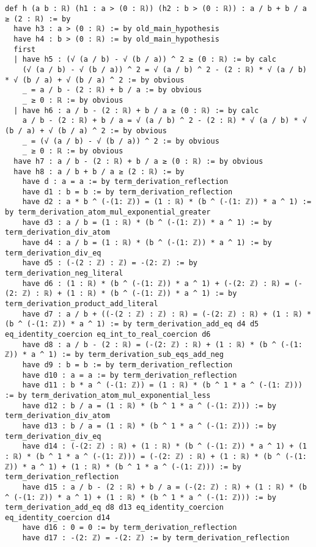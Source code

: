 \documentclass{article}
\begin{document}
\begin{tcolorbox}[colback=white!10, width=\linewidth]
\begin{lstlisting}[language=Lean4]
def h (a b : ℝ) (h1 : a > (0 : ℝ)) (h2 : b > (0 : ℝ)) : a / b + b / a ≥ (2 : ℝ) := by
  have h3 : a > (0 : ℝ) := by old_main_hypothesis
  have h4 : b > (0 : ℝ) := by old_main_hypothesis
  first
  | have h5 : (√ (a / b) - √ (b / a)) ^ 2 ≥ (0 : ℝ) := by calc
    (√ (a / b) - √ (b / a)) ^ 2 = √ (a / b) ^ 2 - (2 : ℝ) * √ (a / b) * √ (b / a) + √ (b / a) ^ 2 := by obvious
    _ = a / b - (2 : ℝ) + b / a := by obvious
    _ ≥ 0 : ℝ := by obvious
  | have h6 : a / b - (2 : ℝ) + b / a ≥ (0 : ℝ) := by calc
    a / b - (2 : ℝ) + b / a = √ (a / b) ^ 2 - (2 : ℝ) * √ (a / b) * √ (b / a) + √ (b / a) ^ 2 := by obvious
    _ = (√ (a / b) - √ (b / a)) ^ 2 := by obvious
    _ ≥ 0 : ℝ := by obvious
  have h7 : a / b - (2 : ℝ) + b / a ≥ (0 : ℝ) := by obvious
  have h8 : a / b + b / a ≥ (2 : ℝ) := by
    have d : a = a := by term_derivation_reflection
    have d1 : b = b := by term_derivation_reflection
    have d2 : a * b ^ (-(1: ℤ)) = (1 : ℝ) * (b ^ (-(1: ℤ)) * a ^ 1) := by term_derivation_atom_mul_exponential_greater
    have d3 : a / b = (1 : ℝ) * (b ^ (-(1: ℤ)) * a ^ 1) := by term_derivation_div_atom
    have d4 : a / b = (1 : ℝ) * (b ^ (-(1: ℤ)) * a ^ 1) := by term_derivation_div_eq
    have d5 : (-(2 : ℤ) : ℤ) = -(2: ℤ) := by term_derivation_neg_literal
    have d6 : (1 : ℝ) * (b ^ (-(1: ℤ)) * a ^ 1) + (-(2: ℤ) : ℝ) = (-(2: ℤ) : ℝ) + (1 : ℝ) * (b ^ (-(1: ℤ)) * a ^ 1) := by term_derivation_product_add_literal
    have d7 : a / b + ((-(2 : ℤ) : ℤ) : ℝ) = (-(2: ℤ) : ℝ) + (1 : ℝ) * (b ^ (-(1: ℤ)) * a ^ 1) := by term_derivation_add_eq d4 d5 eq_identity_coercion eq_int_to_real_coercion d6
    have d8 : a / b - (2 : ℝ) = (-(2: ℤ) : ℝ) + (1 : ℝ) * (b ^ (-(1: ℤ)) * a ^ 1) := by term_derivation_sub_eqs_add_neg
    have d9 : b = b := by term_derivation_reflection
    have d10 : a = a := by term_derivation_reflection
    have d11 : b * a ^ (-(1: ℤ)) = (1 : ℝ) * (b ^ 1 * a ^ (-(1: ℤ))) := by term_derivation_atom_mul_exponential_less
    have d12 : b / a = (1 : ℝ) * (b ^ 1 * a ^ (-(1: ℤ))) := by term_derivation_div_atom
    have d13 : b / a = (1 : ℝ) * (b ^ 1 * a ^ (-(1: ℤ))) := by term_derivation_div_eq
    have d14 : (-(2: ℤ) : ℝ) + (1 : ℝ) * (b ^ (-(1: ℤ)) * a ^ 1) + (1 : ℝ) * (b ^ 1 * a ^ (-(1: ℤ))) = (-(2: ℤ) : ℝ) + (1 : ℝ) * (b ^ (-(1: ℤ)) * a ^ 1) + (1 : ℝ) * (b ^ 1 * a ^ (-(1: ℤ))) := by term_derivation_reflection
    have d15 : a / b - (2 : ℝ) + b / a = (-(2: ℤ) : ℝ) + (1 : ℝ) * (b ^ (-(1: ℤ)) * a ^ 1) + (1 : ℝ) * (b ^ 1 * a ^ (-(1: ℤ))) := by term_derivation_add_eq d8 d13 eq_identity_coercion eq_identity_coercion d14
    have d16 : 0 = 0 := by term_derivation_reflection
    have d17 : -(2: ℤ) = -(2: ℤ) := by term_derivation_reflection

\end{lstlisting}
\end{tcolorbox}
\end{document}
